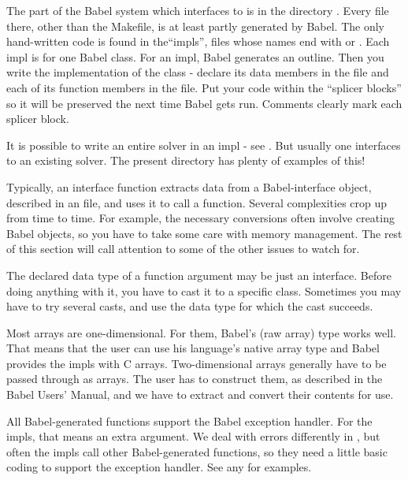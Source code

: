 The part of the Babel system which interfaces to \hypre{} is in the
directory .  Every file there, other than the
Makefile, is at least partly generated by Babel.  The only
hand-written code is found in the``impls'', files whose names end with
 or .  Each impl is for one Babel class.
For an impl, Babel generates an outline.  Then you write the
implementation of the class - declare its data members in the
 file and each of its function members in the
 file. Put your code within the ``splicer blocks'' so it
will be preserved the next time Babel gets run.  Comments clearly mark
each splicer block.

It is possible to write an entire solver in an impl - see
.  But usually one interfaces to an existing
\hypre{} solver.  The present  directory has plenty of
examples of this!

Typically, an interface function extracts data from a Babel-interface
object, described in an  file, and uses it to call a
 function.  Several complexities crop up from time to
time.  For example, the necessary conversions often involve creating
Babel objects, so you have to take some care with memory management.
The rest of this section will call attention to some of the other
issues to watch for.

The declared data type of a function argument may be just an
interface.  Before doing anything with it, you have to cast it to a
specific class.  Sometimes you may have to try several casts, and use
the data type for which the cast succeeds.

Most \hypre{} arrays are one-dimensional.  For them, Babel's
 (raw array) type works well.  That means that the user
can use his language's native array type and Babel provides the impls
with C arrays.  Two-dimensional arrays generally have to be passed
through as  arrays.  The user has to construct them, as
described in the Babel Users' Manual, and we have to extract and
convert their contents for \hypre{} use.

All Babel-generated functions support the Babel exception handler.
For the impls, that means an extra argument.  We deal with errors
differently in \hypre{}, but often the impls call other
Babel-generated functions, so they need a little basic coding to
support the exception handler.  See any  for examples.

